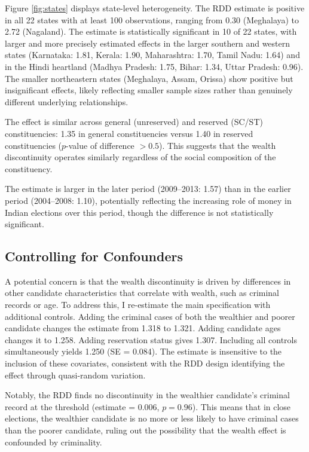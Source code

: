 \documentclass[12pt]{article}
\begin{document}
Figure \ref{fig:states} displays state-level heterogeneity. The RDD estimate is positive in all 22 states with at least 100 observations, ranging from 0.30 (Meghalaya) to 2.72 (Nagaland). The estimate is statistically significant in 10 of 22 states, with larger and more precisely estimated effects in the larger southern and western states (Karnataka: 1.81, Kerala: 1.90, Maharashtra: 1.70, Tamil Nadu: 1.64) and in the Hindi heartland (Madhya Pradesh: 1.75, Bihar: 1.34, Uttar Pradesh: 0.96). The smaller northeastern states (Meghalaya, Assam, Orissa) show positive but insignificant effects, likely reflecting smaller sample sizes rather than genuinely different underlying relationships.

The effect is similar across general (unreserved) and reserved (SC/ST) constituencies: 1.35 in general constituencies versus 1.40 in reserved constituencies ($p$-value of difference $> 0.5$). This suggests that the wealth discontinuity operates similarly regardless of the social composition of the constituency.

The estimate is larger in the later period (2009--2013: 1.57) than in the earlier period (2004--2008: 1.10), potentially reflecting the increasing role of money in Indian elections over this period, though the difference is not statistically significant.

\subsection{Controlling for Confounders}

A potential concern is that the wealth discontinuity is driven by differences in other candidate characteristics that correlate with wealth, such as criminal records or age. To address this, I re-estimate the main specification with additional controls. Adding the criminal cases of both the wealthier and poorer candidate changes the estimate from 1.318 to 1.321. Adding candidate ages changes it to 1.258. Adding reservation status gives 1.307. Including all controls simultaneously yields 1.250 (SE = 0.084). The estimate is insensitive to the inclusion of these covariates, consistent with the RDD design identifying the effect through quasi-random variation.

Notably, the RDD finds no discontinuity in the wealthier candidate's criminal record at the threshold (estimate = 0.006, $p = 0.96$). This means that in close elections, the wealthier candidate is no more or less likely to have criminal cases than the poorer candidate, ruling out the possibility that the wealth effect is confounded by criminality.
\end{document}
